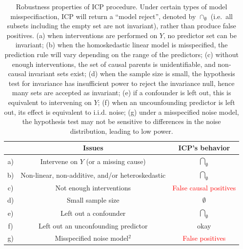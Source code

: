 \documentclass{article}
\begin{document}
\begin{table}[h]
\centering
  \begin{tabular}{c|c|c|}
    \hline
    &\textbf{Issues} & \textbf{ICP's behavior} \\
    \hline
    a) & Intervene on $Y$ (or a missing cause) &
    $\underset{\emptyset}{\bigcap}$ \\
    \hline
    b) & Non-linear, non-additive, and/or heteroskedastic &
    $\underset{\emptyset}{\bigcap}$ \\
    \hline
    c) & Not enough interventions &
    \textcolor{red}{False causal positives} \\
    \hline
    d) & Small sample size &
    $\emptyset$ \\
    \hline
    e) & Left out a confounder & $\underset{\emptyset}{\bigcap}$ \\
    \hline
    f) & Left out an unconfounding predictor & okay  \\
    \hline
    g) & Misspecified noise model$^2$ & \textcolor{red}{False positives}\\\hline
  \end{tabular}
\caption{Robustness properties of ICP procedure.  Under certain types
  of model misspecifiaction, ICP will return a ``model reject'',
  denoted by $\cap_{\emptyset}$ (i.e.\ all subsets including the empty
  set are not invariant), rather than produce false positives.
(a) when interventions are performed on $Y$, no predictor set can be invariant;
(b) when the homoskedastic linear model is misspecified, the prediction rule
will vary depending on the range of the predictors; (c) without enough interventions,
the set of causal parents is unidentifiable, and non-causal invariant sets exist;
(d) when the sample size is small, the hypothesis test for invariance has insufficient power to reject the invariance null,
hence many sets are accepted as invariant;
(e) if a confounder is left out, this is equivalent to intervening on $Y$;
(f) when an uncounfounding predictor is left out, its effect is equivalent to i.i.d. noise;
(g) under a misspecified noise model, the hypothesis test may not be sensitive to differences in the noise distribution,
leading to low power.
}
\label{tab:icp}
\end{table}




\end{document}
